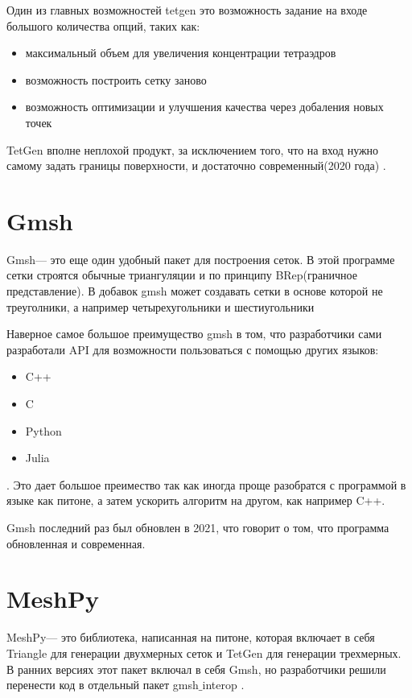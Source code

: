 Один из главных возможностей tetgen это возможность задание на входе большого количества опций, таких как:
\begin{itemize}
    \item максимальный объем для увеличения концентрации тетраэдров
    \item возможность построить сетку заново
    \item возможность оптимизации и улучшения качества через добаления новых точек
\end{itemize}

TetGen вполне неплохой продукт, за исключением того, что на вход нужно самому задать границы поверхности, и достаточно современный(2020 года) \cite{tetgen}.
\section{Gmsh}

Gmsh--- это еще один удобный пакет для построения сеток. В этой программе сетки строятся обычные триангуляции и по принципу BRep(граничное представление). В добавок gmsh может создавать сетки в основе которой не треуголники, а например четырехугольники и шестиугольники\cite[c.~8]{gmesh}

Наверное самое большое преимущество gmsh в том, что разработчики сами разработали API для возможности пользоваться с помощью других языков:
\begin{itemize}
    \item C++
    \item C
    \item Python
    \item Julia
\end{itemize}
\cite[c.~249]{gmesh}. Это дает большое преимество так как иногда проще разобратся с программой в языке как питоне, а затем ускорить алгоритм на другом, как например C++. 

Gmsh последний раз был обновлен в 2021, что говорит о том, что программа обновленная и современная\cite{gmesh}.  
\section{MeshPy}

MeshPy--- это библиотека, написанная на питоне, которая включает в себя Triangle для генерации двухмерных сеток и TetGen для генерации трехмерных. В ранних версиях этот пакет включал в себя Gmsh, но разработчики решили перенести код в отдельный пакет gmsh$\_$interop \cite{meshpy}. 

